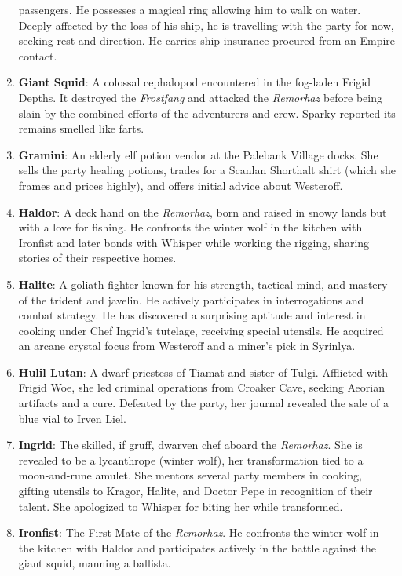 \documentclass[
  letterpaper,12pt,twoside,twocolumn,openany,
  nodeprecatedcode,bg=full]{dndbook}
\begin{document}
\begin{enumerate}
  passengers. He possesses a magical ring allowing him to walk on water.
  Deeply affected by the loss of his ship, he is travelling with the
  party for now, seeking rest and direction. He carries ship insurance
  procured from an Empire contact.
\item
  \textbf{Giant Squid}: A colossal cephalopod encountered in the
  fog-laden Frigid Depths. It destroyed the \emph{Frostfang} and
  attacked the \emph{Remorhaz} before being slain by the combined
  efforts of the adventurers and crew. Sparky reported its remains
  smelled like farts.
\item
  \textbf{Gramini}: An elderly elf potion vendor at the Palebank Village
  docks. She sells the party healing potions, trades for a Scanlan
  Shorthalt shirt (which she frames and prices highly), and offers
  initial advice about Westeroff.
\item
  \textbf{Haldor}: A deck hand on the \emph{Remorhaz}, born and raised
  in snowy lands but with a love for fishing. He confronts the winter
  wolf in the kitchen with Ironfist and later bonds with Whisper while
  working the rigging, sharing stories of their respective homes.
\item
  \textbf{Halite}: A goliath fighter known for his strength, tactical
  mind, and mastery of the trident and javelin. He actively participates
  in interrogations and combat strategy. He has discovered a surprising
  aptitude and interest in cooking under Chef Ingrid's tutelage,
  receiving special utensils. He acquired an arcane crystal focus from
  Westeroff and a miner's pick in Syrinlya.
\item
  \textbf{Hulil Lutan}: A dwarf priestess of Tiamat and sister of Tulgi.
  Afflicted with Frigid Woe, she led criminal operations from Croaker
  Cave, seeking Aeorian artifacts and a cure. Defeated by the party, her
  journal revealed the sale of a blue vial to Irven Liel.
\item
  \textbf{Ingrid}: The skilled, if gruff, dwarven chef aboard the
  \emph{Remorhaz}. She is revealed to be a lycanthrope (winter wolf),
  her transformation tied to a moon-and-rune amulet. She mentors several
  party members in cooking, gifting utensils to Kragor, Halite, and
  Doctor Pepe in recognition of their talent. She apologized to Whisper
  for biting her while transformed.
\item
  \textbf{Ironfist}: The First Mate of the \emph{Remorhaz}. He confronts
  the winter wolf in the kitchen with Haldor and participates actively
  in the battle against the giant squid, manning a ballista.

\end{enumerate}
\end{document}

